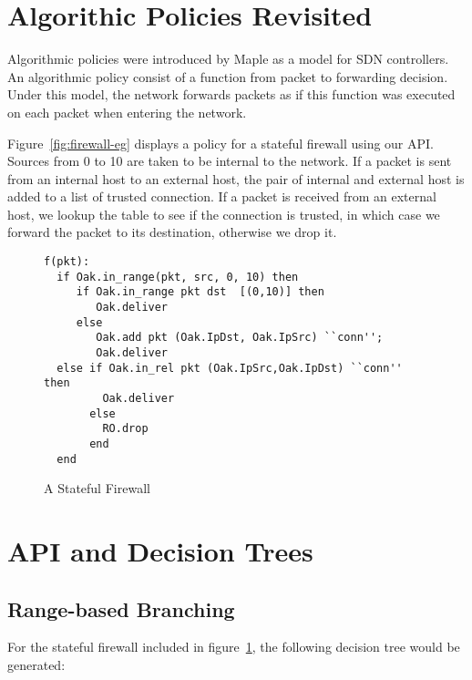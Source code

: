 \documentclass[12pt]{article}
\begin{document}
\section*{Algorithic Policies Revisited}
Algorithmic policies were introduced by Maple as a model for SDN controllers. An algorithmic policy consist of a function from packet to forwarding decision. Under this model, the network forwards packets as if this function was executed on each packet when entering the network. 

Figure~\ref{fig:firewall-eg} displays a policy for a stateful firewall using our API. Sources from 0 to 10 are taken to be internal to the network. If a packet is sent from an internal host to an external host, the pair of internal and external host is added to a list of trusted connection. If a packet is received from an external host, we lookup the table to see if the connection is trusted, in which case we forward the packet to its destination, otherwise we drop it.


\begin{figure}
\begin{lstlisting}
f(pkt):
  if Oak.in_range(pkt, src, 0, 10) then
     if Oak.in_range pkt dst  [(0,10)] then
        Oak.deliver
     else 
        Oak.add pkt (Oak.IpDst, Oak.IpSrc) ``conn'';
        Oak.deliver
  else if Oak.in_rel pkt (Oak.IpSrc,Oak.IpDst) ``conn'' then
         Oak.deliver
       else
         RO.drop
       end
  end                
  \end{lstlisting}
\label{fig:firewallcode}
\caption{A Stateful Firewall}
\end{figure}




\section*{API and Decision Trees}
   \subsection*{Range-based Branching}


   
   

  For the stateful firewall included in figure~\ref{fig:firewallcode}, the following decision tree would be generated:
\end{document}
